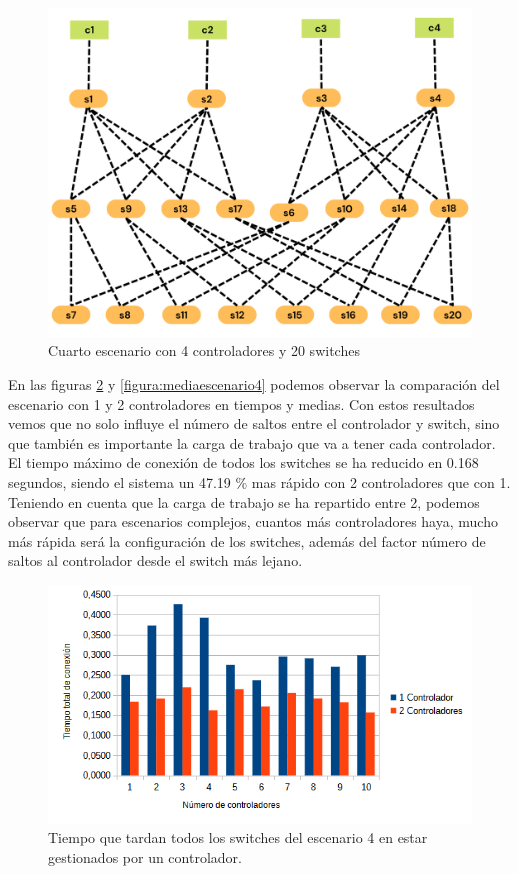 \documentclass[a4paper, 12pt]{book}
\begin{document}
	
	\begin{figure}[H]
		\centering
		\includegraphics[width=13cm, keepaspectratio]{img/e4_3}
		\caption{Cuarto escenario con 4 controladores y 20 switches}
		\label{figura:e4_3}
	\end{figure}
	
En las figuras \ref{figura:comparativaescenario4} y \ref{figura:mediaescenario4} podemos observar la comparación del escenario con 1 y 2 controladores en tiempos y medias. Con estos resultados vemos que no solo influye el número de saltos entre el controlador y switch, sino que también es importante la carga de trabajo que va a tener cada controlador. El tiempo máximo de conexión de todos los switches se ha reducido en 0.168 segundos, siendo el sistema un 47.19 \% mas rápido con 2 controladores que con 1. Teniendo en cuenta que la carga de trabajo se ha repartido entre 2, podemos observar que para escenarios complejos, cuantos más controladores haya, mucho más rápida será la configuración de los switches, además del factor número de saltos al controlador desde el switch más lejano.
		
		
	
	
	\begin{figure}[H]
		\centering
		\includegraphics[width=12cm, keepaspectratio]{img/comparativaescenario4}
		\caption{Tiempo que tardan todos los switches del escenario 4 en estar gestionados por un controlador.}
		\label{figura:comparativaescenario4}
	\end{figure}
	
\end{document}
